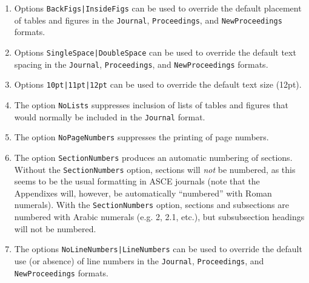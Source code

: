 \documentclass[Journal,letterpaper,NoLineNumbers]{ascelike-new}
\begin{document}
\begin{enumerate}
%
\item
Options \verb+BackFigs|InsideFigs+ can be used to override 
the default placement of tables
and figures in the \texttt{Journal}, \texttt{Proceedings}, and
\texttt{NewProceed\-ings} formats.
\item
Options \verb+SingleSpace|DoubleSpace+ can be used to override 
the default text spacing in the 
\texttt{Journal}, \texttt{Proceedings}, and
\texttt{NewProceedings} formats.
\item
Options \verb+10pt|11pt|12pt+ can be used to override the 
default text size (12pt).
\item
The option \texttt{NoLists} suppresses inclusion of lists of tables
and figures that would normally be included in the \texttt{Journal}
format.
\item
The option \texttt{NoPageNumbers} suppresses the printing of page numbers.
\item
The option \texttt{SectionNumbers} produces an automatic numbering of sections.
Without the \texttt{SectionNumbers} option, sections will \emph{not} be
numbered, as this seems to be the usual formatting in ASCE journals 
(note that the Appendixes will, however, be automatically
``numbered'' with Roman numerals).  
With the \texttt{SectionNumbers} option, sections and
subsections are numbered with Arabic numerals (e.g. 2, 2.1, etc.), but
subsubsection headings will not be numbered.  
\item
The options \verb+NoLineNumbers|LineNumbers+ can be used to override
the default use (or absence) of line numbers in the \texttt{Journal},
\texttt{Proceedings}, and
\texttt{NewProceedings} formats.
\end{enumerate}

%
%

%
\end{document}
